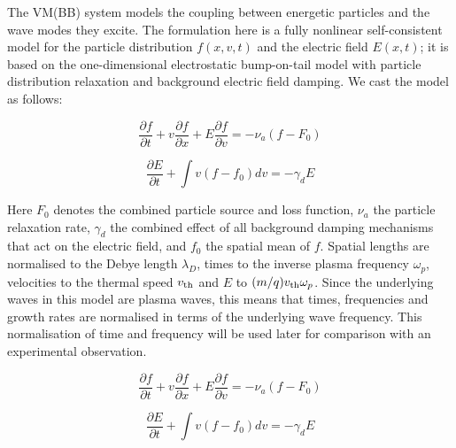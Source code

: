 The VM(BB) system models the coupling between energetic particles and the wave modes they excite.
The formulation here is a fully nonlinear self-consistent model for the particle distribution $f(x,v,t)$ and the electric field $E(x,t)$; it is based on the one-dimensional electrostatic bump-on-tail model with particle distribution relaxation and background electric field damping. We cast the model as follows:

\begin{equation}
\label{MVE}
	\frac{\partial f}{\partial t} + v \frac{\partial f}{\partial x} + E \frac{\partial f}{\partial v} =
		- \nu_a \left( f - F_0 \right)
\end{equation}

\begin{equation}
\label{MDCE}
	\frac{\partial E}{\partial t} + \int v \left( f - f_0 \right) dv = - \gamma_d E
\end{equation}

Here $F_0$ denotes the combined particle source and loss function, $\nu_a$ the particle relaxation rate, $\gamma_d$ the combined effect of all background damping mechanisms that act on the electric field, and $f_0$ the spatial mean of $f$.
Spatial lengths are normalised to the Debye length $\lambda_D$, times to the inverse plasma frequency $\omega_p$, velocities to the thermal speed $v_{\rm th}$ and $E$ to $(m/q) v_{\rm th} \omega_p$. Since the underlying waves in this model are plasma waves, this means that times, frequencies and growth rates are normalised in terms of the underlying wave frequency. This normalisation of time and frequency will be used later for comparison with an experimental observation.

\[
\label{MVE}
	\frac{\partial f}{\partial t} + v \frac{\partial f}{\partial x} + E \frac{\partial f}{\partial v} =
		- \nu_a \left( f - F_0 \right)
\]

\[
\label{MDCE}
	\frac{\partial E}{\partial t} + \int v \left( f - f_0 \right) dv = - \gamma_d E
\]

% 


